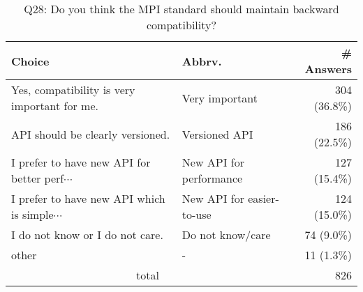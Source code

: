 \begin{table}[htb]%
\begin{center}%
\caption{Q28: Do you think the MPI standard should maintain backward compatibility?}%
\label{tab:Q28-ans}%
\begin{tabular}{l|l|r}%
\hline%
Choice & Abbrv. & \# Answers \\%
\hline%
{\small Yes, compatibility is very important for me.} & Very important & 304 (36.8\%) \\%
API should be clearly versioned. & Versioned API & 186 (22.5\%) \\%
{\small I prefer to have new API for better perf$\cdots$} & New API for performance & 127 (15.4\%) \\%
{\small I prefer to have new API which is simple$\cdots$} & New API for easier-to-use & 124 (15.0\%) \\%
I do not know or I do not care. & Do not know/care & 74 (9.0\%) \\%
other & - & 11 (1.3\%) \\%
\hline%
\multicolumn{2}{c}{total} & 826 \\%
\hline%
\end{tabular}%
\end{center}%
\end{table}%
